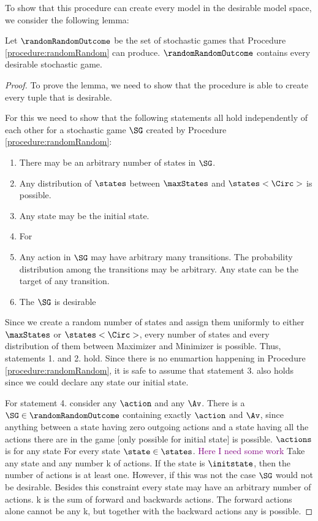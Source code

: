 To show that this procedure can create every model in the desirable model space, we consider the following lemma:
\begin{lemma}
Let $\randomRandomOutcome$ be the set of stochastic games that Procedure \ref{procedure:randomRandom} can produce. $\randomRandomOutcome$ contains every desirable stochastic game.
\end{lemma}
\begin{proof}
To prove the lemma, we need to show that the procedure is able to create every tuple that is desirable.

For this we need to show that the following statements all hold independently of each other for a stochastic game $\SG$ created by Procedure \ref{procedure:randomRandom}:
\begin{enumerate}
\item There may be an arbitrary number of states in $\SG$.
\item Any distribution of $\states$ between $\maxStates$ and $\states<\Circ>$ is possible.
\item Any state may be the initial state.
\item For%
\item Any action in $\SG$ may have arbitrary many transitions. The probability distribution among the transitions may be arbitrary. Any state can be the target of any transition.
\item The $\SG$ is desirable
\end{enumerate}


Since we create a random number of states and assign them uniformly to either $\maxStates$ or $\states<\Circ>$, every number of states and every distribution of them between Maximizer and Minimizer is possible. Thus, statements 1. and 2. hold. Since there is no enumartion happening in Procedure \ref{procedure:randomRandom}, it is safe to assume that statement 3. also holds since we could declare any state our initial state.

For statement 4. consider any $\action$ and any $\Av$. 
There is a $\SG \in \randomRandomOutcome$ containing exactly $\action$ and $\Av$, since anything between a state having zero outgoing actions and a state having all the actions there are in the game [only possible for initial state] is possible. $\actions$ is for any state  For every state $\state \in \states$.
\textcolor{purple}{Here I need some work}
Take any state and any number k of actions. If the state is $\initstate$, then the number of actions is at least one. However, if this was not the case $\SG$ would not be desirable. Besides this constraint every state may have an arbitrary number of actions. k is the sum of forward and backwards actions. The forward actions alone cannot be any k, but together with the backward actions any is possible. 


\end{proof}
